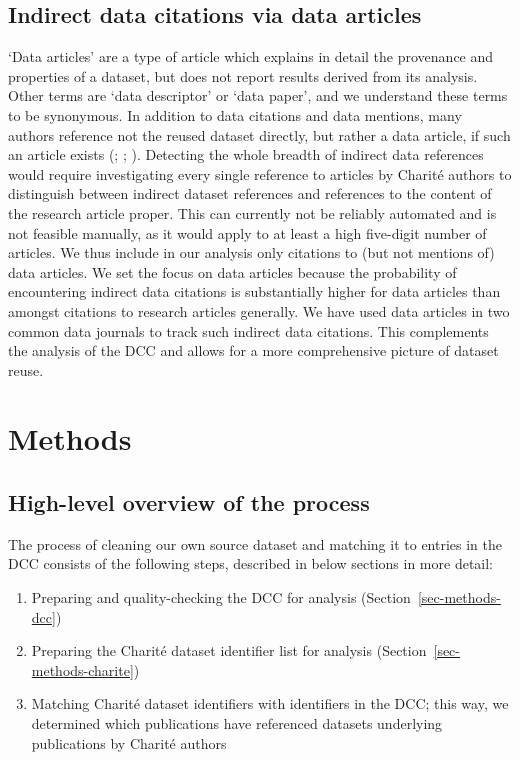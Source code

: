 \documentclass[
  letterpaper,
  DIV=11,
  numbers=noendperiod]{scrartcl}
\providecommand{\tightlist}{%
  \setlength{\itemsep}{0pt}\setlength{\parskip}{0pt}}\usepackage{longtable,booktabs,array}
\begin{document}
\subsection{Indirect data citations via data
articles}\label{sec-intro-data-articles}

`Data articles' are a type of article which explains in detail the
provenance and properties of a dataset, but does not report results
derived from its analysis. Other terms are `data descriptor' or `data
paper', and we understand these terms to be synonymous. In addition to
data citations and data mentions, many authors reference not the reused
dataset directly, but rather a data article, if such an article exists
(;
;
). Detecting the whole breadth
of indirect data references would require investigating every single
reference to articles by Charité authors to distinguish between indirect
dataset references and references to the content of the research article
proper. This can currently not be reliably automated and is not feasible
manually, as it would apply to at least a high five-digit number of
articles. We thus include in our analysis only citations to (but not
mentions of) data articles. We set the focus on data articles because
the probability of encountering indirect data citations is substantially
higher for data articles than amongst citations to research articles
generally. We have used data articles in two common data journals to
track such indirect data citations. This complements the analysis of the
DCC and allows for a more comprehensive picture of dataset reuse.

\section{Methods}\label{sec-methods}

\subsection{High-level overview of the
process}\label{sec-methods-overview}

The process of cleaning our own source dataset and matching it to
entries in the DCC consists of the following steps, described in below
sections in more detail:

\begin{enumerate}
\def\labelenumi{(\arabic{enumi})}
\tightlist
\item
  Preparing and quality-checking the DCC for analysis
  (Section~\ref{sec-methods-dcc})
\item
  Preparing the Charité dataset identifier list for analysis
  (Section~\ref{sec-methods-charite})
\item
  Matching Charité dataset identifiers with identifiers in the DCC; this
  way, we determined which publications have referenced datasets
  underlying publications by Charité authors
\end{enumerate}
\end{document}
